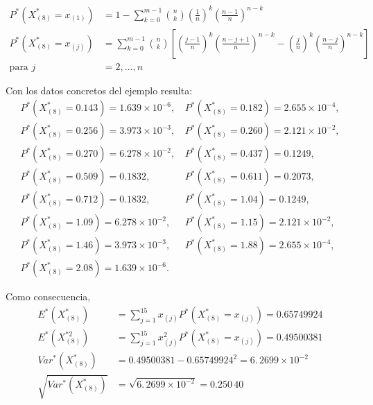 \documentclass[
]{book}
\theoremstyle{break}
\theoremstyle{definition}
\theoremstyle{definition}
\theoremstyle{definition}
\theoremstyle{definition}
\theoremstyle{remark}
\begin{document}
\[\begin{aligned}
P^{\ast}\left( X_{\left( 8 \right)}^{\ast}=x_{(1)} \right)
&= 1-\sum_{k=0}^{m-1}\binom{n}{k}\left( \frac{1}{n} \right)^{k}\left( \frac{
n-1}{n} \right)^{n-k} \\
P^{\ast}\left( X_{\left( 8 \right)}^{\ast}=x_{(j)} \right)
&= \sum_{k=0}^{m-1}\binom{n}{k}\left[ \left( \frac{j-1}{n} \right)^{k}\left( 
\frac{n-j+1}{n} \right)^{n-k} - \left( \frac{j}{n} \right)^{k}\left( \frac{n-j}{n} \right)^{n-k}
\right] \\
\text{para }j &= 2,\ldots ,n
\end{aligned}\]

Con los datos concretos del ejemplo resulta:
\[\begin{array}{ll}
P^{\ast}\left( X_{\left( 8 \right)}^{\ast} = 0.143 \right) = 1.639\times 10^{-6}\text{, } 
& P^{\ast}\left( X_{\left( 8 \right)}^{\ast} = 0.182 \right) = 2.655\times 10^{-4},\\
P^{\ast}\left( X_{\left( 8 \right)}^{\ast} = 0.256 \right) = 3.973\times 10^{-3}\text{, } 
& P^{\ast}\left( X_{\left( 8 \right)}^{\ast} = 0.260 \right) = 2.121\times 10^{-2}, \\
P^{\ast}\left( X_{\left( 8 \right)}^{\ast} = 0.270 \right) = 6.278\times 10^{-2}\text{, }
& P^{\ast}\left( X_{\left( 8 \right)}^{\ast} = 0.437 \right) = 0.1249, \\
P^{\ast}\left( X_{\left( 8 \right)}^{\ast} = 0.509 \right) = 0.1832\text{, }
& P^{\ast}\left( X_{\left( 8 \right)}^{\ast} = 0.611 \right) = 0.2073,\\
P^{\ast}\left( X_{\left( 8 \right)}^{\ast} = 0.712 \right) = 0.1832\text{, }
& P^{\ast}\left( X_{\left( 8 \right)}^{\ast} = 1.04 \right) = 0.1249,\\
P^{\ast}\left( X_{\left( 8 \right)}^{\ast} = 1.09 \right) = 6.278\times 10^{-2}\text{, }
& P^{\ast}\left( X_{\left( 8 \right)}^{\ast} = 1.15 \right) = 2.121\times 10^{-2}, \\
P^{\ast}\left( X_{\left( 8 \right)}^{\ast} = 1.46 \right) = 3.973\times 10^{-3}\text{, }
& P^{\ast}\left( X_{\left( 8 \right)}^{\ast} = 1.88 \right) = 2.655\times 10^{-4}, \\
P^{\ast}\left( X_{\left( 8 \right)}^{\ast} = 2.08 \right) = 1.639\times 10^{-6}. 
\end{array}\]

Como consecuencia,
\[\begin{aligned}
E^{\ast}\left( X_{\left( 8 \right)}^{\ast} \right)
&= \sum_{j=1}^{15}x_{(j)}P^{\ast}\left( X_{\left( 8 \right)
}^{\ast}=x_{(j)} \right) =0.65749924 \\
E^{\ast}\left( X_{\left( 8 \right)}^{\ast 2} \right)
&= \sum_{j=1}^{15}x_{(j)}^2P^{\ast}\left( X_{\left( 8 \right)
}^{\ast}=x_{(j)} \right) =0.49500381 \\
Var^{\ast}\left( X_{\left( 8 \right)}^{\ast} \right)
&= 0.49500381-0.65749924^2=6.\, 2699\times 10^{-2} \\
\sqrt{Var^{\ast}\left( X_{\left( 8 \right)}^{\ast} \right)} &= \sqrt{
6.\, 2699\times 10^{-2}}=0.250\,40
\end{aligned}\]
\end{document}
